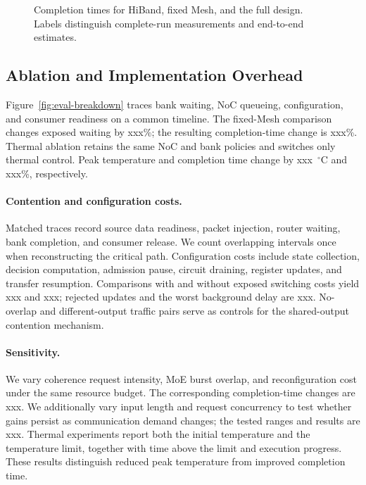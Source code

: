 \documentclass[conference,10pt]{IEEEtran}
\newcommand{\Description}[1]{}
\begin{document}
\begin{figure}[!t]
\centering
\fbox{\rule{0pt}{18mm}\rule{0.94\columnwidth}{0pt}}
\caption{Completion times for HiBand, fixed Mesh, and the full design.
Labels distinguish complete-run measurements and end-to-end estimates.}
\Description{Placeholder for paired workload completion times.}
\label{fig:eval-overall}
\end{figure}

\subsection{Ablation and Implementation Overhead}
Figure~\ref{fig:eval-breakdown} traces bank waiting, NoC queueing,
configuration, and consumer readiness on a common timeline.
The fixed-Mesh comparison changes exposed waiting by xxx\%;
the resulting completion-time change is xxx\%.
Thermal ablation retains the same NoC and bank policies and switches
only thermal control. Peak temperature and completion time change by
xxx~$^{\circ}$C and xxx\%, respectively.

\paragraph{Contention and configuration costs.}
Matched traces record source data readiness, packet injection,
router waiting, bank completion, and consumer release. We count
overlapping intervals once when reconstructing the critical path.
Configuration costs include state collection, decision computation,
admission pause, circuit draining, register updates, and transfer
resumption. Comparisons with and without exposed switching costs
yield xxx and xxx; rejected updates and the worst background delay
are xxx. No-overlap and different-output traffic pairs serve as
controls for the shared-output contention mechanism.

\paragraph{Sensitivity.}
We vary coherence request intensity, MoE burst overlap, and
reconfiguration cost under the same resource budget. The corresponding
completion-time changes are xxx. We additionally vary input length
and request concurrency to test whether gains persist as communication
demand changes; the tested ranges and results are xxx. Thermal
experiments report both the initial temperature and the temperature
limit, together with time above the limit and execution progress.
These results distinguish reduced peak temperature from improved
completion time.
\end{document}
